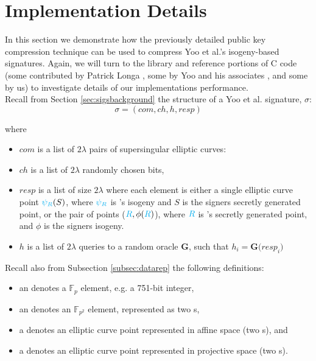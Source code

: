 \section{Implementation Details}
\label{sec:compimplementation}

In this section we demonstrate how the previously detailed public key compression technique can be used to compress Yoo et al.'s isogeny-based signatures. Again, we will turn to the \sidh library and reference portions of C code (some contributed by Patrick Longa \cite{sidhcode}, some by Yoo and his associates \cite{yoosigcode}, and some by us) to investigate details of our implementations performance.\\

\noindent
Recall from Section \ref{sec:sigsbackground} the structure of a Yoo et al. signature, $\sigma$:
$$
\sigma = (com, ch, h, resp)
$$

\noindent
where

\begin{itemize}
\item $com$ is a list of $2\lambda$ pairs of supersingular elliptic curves: 
\item $ch$ is a list of $2\lambda$ randomly chosen bits,
\item $resp$ is a list of size $2\lambda$ where each element is either a single elliptic curve point $\textcolor{cyan}{\psi_R}(S)$, where $\textcolor{cyan}{\psi_R}$ is \randall's isogeny and $S$ is the signers secretly generated point, or the pair of points ($\textcolor{cyan}{R}, \phi(\textcolor{cyan}{R})$), where $\textcolor{cyan}{R}$ is \randall's secretly generated point, and $\phi$ is the signers isogeny.
\item $h$ is a list of $2\lambda$ queries to a random oracle \textbf{G}, such that $h_{i} = \textbf{G(}resp_{i}\textbf{)}$
\end{itemize}

\noindent
Recall also from Subsection \ref{subsec:datarep} the following definitions:
\begin{itemize}
\item an  denotes a $\mathbb{F}_{p}$ element, e.g. a 751-bit integer,
\item an  denotes an $\mathbb{F}_{p^2}$ element, represented as two s,
\item a  denotes an elliptic curve point represented in affine space (two s), and
\item a  denotes an elliptic curve point represented in projective space (two s).
\end{itemize}

